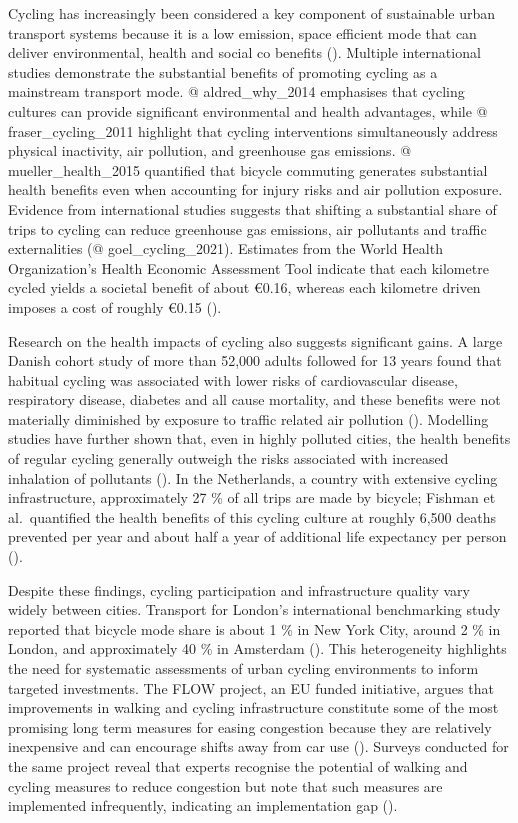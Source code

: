 \documentclass[
  12pt,
  oneside]{book}
\begin{document}
Cycling has increasingly been considered a key component of sustainable urban transport systems because it is a low emission, space efficient mode that can deliver environmental, health and social co benefits (\textcite{yanocha_economic_2022}). Multiple international studies demonstrate the substantial benefits of promoting cycling as a mainstream transport mode. @ aldred\_why\_2014 emphasises that cycling cultures can provide significant environmental and health advantages, while @ fraser\_cycling\_2011 highlight that cycling interventions simultaneously address physical inactivity, air pollution, and greenhouse gas emissions. @ mueller\_health\_2015 quantified that bicycle commuting generates substantial health benefits even when accounting for injury risks and air pollution exposure. Evidence from international studies suggests that shifting a substantial share of trips to cycling can reduce greenhouse gas emissions, air pollutants and traffic externalities (@ goel\_cycling\_2021). Estimates from the World Health Organization's Health Economic Assessment Tool indicate that each kilometre cycled yields a societal benefit of about €0.16, whereas each kilometre driven imposes a cost of roughly €0.15 (\textcite{yanocha_economic_2022}).

Research on the health impacts of cycling also suggests significant gains. A large Danish cohort study of more than 52,000 adults followed for 13 years found that habitual cycling was associated with lower risks of cardiovascular disease, respiratory disease, diabetes and all cause mortality, and these benefits were not materially diminished by exposure to traffic related air pollution (\textcite{logan_benefits_2023}). Modelling studies have further shown that, even in highly polluted cities, the health benefits of regular cycling generally outweigh the risks associated with increased inhalation of pollutants (\textcite{logan_benefits_2023}). In the Netherlands, a country with extensive cycling infrastructure, approximately 27 \% of all trips are made by bicycle; Fishman et\,al.~quantified the health benefits of this cycling culture at roughly 6,500 deaths prevented per year and about half a year of additional life expectancy per person (\textcite{fishman_dutch_2015}).

Despite these findings, cycling participation and infrastructure quality vary widely between cities. Transport for London's international benchmarking study reported that bicycle mode share is about 1 \% in New York City, around 2 \% in London, and approximately 40 \% in Amsterdam (\textcite{tfl_international_2014}). This heterogeneity highlights the need for systematic assessments of urban cycling environments to inform targeted investments. The FLOW project, an EU funded initiative, argues that improvements in walking and cycling infrastructure constitute some of the most promising long term measures for easing congestion because they are relatively inexpensive and can encourage shifts away from car use (\textcite{koska_role_nodate}). Surveys conducted for the same project reveal that experts recognise the potential of walking and cycling measures to reduce congestion but note that such measures are implemented infrequently, indicating an implementation gap (\textcite{koska_role_nodate}).
\end{document}
